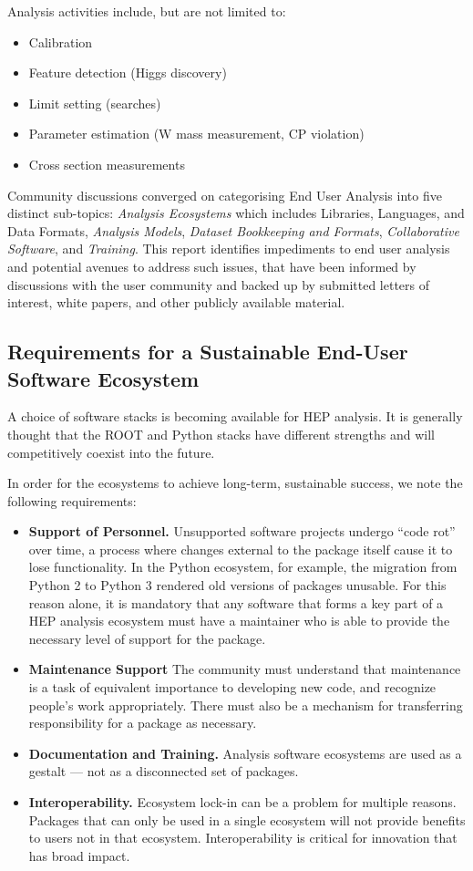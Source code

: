 Analysis activities include, but are not limited to:
\begin{itemize}
  \item Calibration
  \item Feature detection (Higgs discovery)
  \item Limit setting (searches)
  \item Parameter estimation (W mass measurement, CP violation)
  \item Cross section measurements
\end{itemize}

Community discussions converged on categorising End User Analysis into five distinct sub-topics: \textit{Analysis Ecosystems} which includes Libraries, Languages, and Data Formats, \textit{Analysis Models}, \textit{Dataset Bookkeeping and Formats}, \textit{Collaborative Software}, and \textit{Training}.
This report identifies impediments to end user analysis and potential avenues to address such issues, that have been informed by discussions with the user community and backed up by submitted letters of interest, white papers, and other publicly available material.


\subsection{Requirements for a Sustainable End-User Software Ecosystem}
A choice of software stacks is becoming available for HEP analysis. It is generally thought that the ROOT and Python stacks have different strengths and will competitively coexist into the future.

In order for the ecosystems to achieve long-term, sustainable success, we note the following requirements:
\begin{itemize}
    \item \textbf{Support of Personnel.} Unsupported software projects undergo ``code rot'' over time, a process where changes external to the package itself cause it to lose functionality. In the Python ecosystem, for example, the migration from Python 2 to Python 3 rendered old versions of packages unusable. For this reason alone, it is mandatory that any software that forms a key part of a HEP analysis ecosystem must have a maintainer who is able to provide the necessary level of support for the package. 
    \item \textbf{Maintenance Support} The community must understand that maintenance is a task of equivalent importance to developing new code, and recognize people's work appropriately. There must also be a mechanism for transferring responsibility for a package as necessary.
    \item \textbf{Documentation and Training.} Analysis software ecosystems are used as a gestalt --- not as a disconnected set of packages. 
    \item \textbf{Interoperability.} Ecosystem lock-in can be a problem for multiple reasons. Packages that can only be used in a single ecosystem will not provide benefits to users not in that ecosystem. Interoperability is critical for innovation that has broad impact.
\end{itemize}

